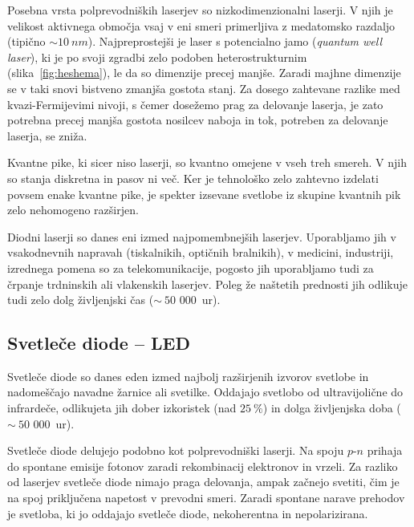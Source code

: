 \begin{remark}
Posebna vrsta polprevodniških laserjev so nizkodimenzionalni laserji. V njih je 
velikost aktivnega območja vsaj v eni smeri primerljiva z medatomsko razdaljo (tipično $\sim 10~\si{nm}$).
Najpreprostejši je laser s potencialno jamo ({\it quantum well laser}), ki 
je po svoji zgradbi zelo podoben heterostrukturnim (slika~\ref{fig:heshema}), le da so dimenzije precej
manjše. Zaradi majhne dimenzije se v taki snovi bistveno zmanjša gostota stanj. 
Za dosego zahtevane razlike med kvazi-Fermijevimi nivoji, s čemer dosežemo prag za delovanje laserja,
je zato potrebna precej manjša gostota nosilcev naboja in tok, potreben za delovanje laserja,
se zniža. 

Kvantne pike, ki sicer niso laserji, so kvantno omejene v vseh treh smereh.
V njih so stanja diskretna in pasov ni več. Ker je tehnološko zelo zahtevno izdelati povsem enake
kvantne pike, je spekter izsevane svetlobe iz skupine kvantnih pik zelo nehomogeno razširjen. 
\end{remark}

Diodni laserji so danes eni izmed najpomembnejših laserjev. Uporabljamo jih v vsakodnevnih napravah 
(tiskalnikih, optičnih bralnikih), v medicini, industriji, izrednega
pomena so za tele\-komunikacije, pogosto jih uporabljamo tudi za 
črpanje trdninskih ali vlakenskih laserjev. 
Poleg že naštetih prednosti jih odlikuje tudi zelo dolg življenjski čas ($\sim~50\,\,000$~ur). 

\subsection{Svetleče diode -- LED}
Svetleče diode so danes eden izmed najbolj razširjenih izvorov svetlobe in nadomeščajo
navadne žarnice ali svetilke. Oddajajo svetlobo od ultravijolične do infrardeče, 
odlikujeta jih 
dober izkoristek (nad $25~\%$) in dolga življenjska doba ($\sim~50\,\,000$~ur).

Svetleče diode delujejo podobno kot polprevodniški laserji. Na spoju $p$-$n$ prihaja do 
spontane emisije fotonov zaradi rekombinacij elektronov in vrzeli. Za razliko od laserjev 
svetleče diode nimajo praga delovanja, ampak začnejo svetiti, čim je na spoj priključena 
napetost v prevodni smeri. Zaradi spontane narave prehodov je svetloba, ki jo oddajajo
svetleče diode, nekoherentna in nepolarizirana. 

